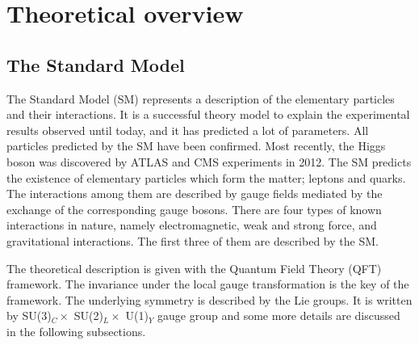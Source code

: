 \chapter{Theoretical overview}
\label{chap:theory}
\section{The Standard Model}
\label{sec:SM}
The Standard Model (SM) represents a description of the elementary particles and their interactions.
It is a successful theory model to explain the experimental results observed until today, and it has predicted a lot of parameters.
All particles predicted by the SM have been confirmed. Most recently, the Higgs boson was discovered by ATLAS and CMS experiments in 2012.
The SM predicts the existence of elementary particles which form the matter; leptons and quarks.
The interactions among them are described by gauge fields mediated by the exchange of the corresponding gauge bosons.
There are four types of known interactions in nature, namely electromagnetic, weak and strong force, and gravitational interactions.
The first three of them are described by the SM.

The theoretical description is given with the Quantum Field Theory (QFT) framework. 
The invariance under the local gauge transformation is the key of the framework. 
The underlying symmetry is described by the Lie groups. 
It is written by SU(3)$_C \times$ SU(2)$_L \times$ U(1)$_Y$ gauge group and some more details are discussed in the following subsections. 

